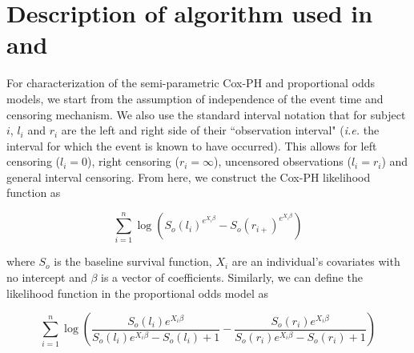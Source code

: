 \documentclass[article]{jss}
\begin{document}
\section[alg1]{Description of algorithm used in  and }

	 
	 For characterization of the semi-parametric Cox-PH and proportional odds models, we start from the assumption of independence of the event time and censoring mechanism. We also use the standard interval notation that for subject $i$, $l_i$ and $r_i$ are the left and right side of their ``observation interval" (\emph{i.e.} the interval for which the event is known to have occurred). This allows for left censoring ($l_i = 0$), right censoring ($r_i = \infty$), uncensored observations ($l_i = r_i$) and general interval censoring. From here, we construct the Cox-PH likelihood function as
	 
	 \[
	 \displaystyle \sum_{i = 1}^n \log \left( S_o(l_i)^{e^{X_i \beta} } - S_o(r_{i+})^{e^{X_i \beta}} \right)
	 \]
	 
	 where $S_o$ is the baseline survival function, $X_i$ are an individual's covariates with no intercept and $\beta$ is a vector of coefficients. Similarly, we can define the likelihood function in the proportional odds model as
	 
	  \[
	 \displaystyle \sum_{i = 1}^n \log \left( \frac{S_o(l_i) e^{X_i \beta}}{S_o(l_i) e^{X_i \beta} -S_o(l_i) + 1 } -\frac{S_o(r_i) e^{X_i \beta}}{S_o(r_i) e^{X_i \beta} -S_o(r_i) + 1 }  \right)
	 \]
	 
\end{document}
